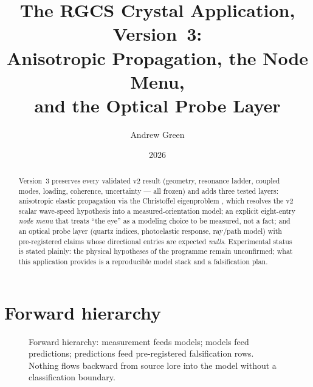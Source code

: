 \documentclass[10pt,letterpaper]{article}
\title{\vspace{-2.0em}\textbf{The RGCS Crystal Application, Version~3:\\
Anisotropic Propagation, the Node Menu,\\ and the Optical Probe Layer}}
\author{Andrew Green}
\date{2026}
\begin{document}
\maketitle

\begin{abstract}
Version~3 preserves every validated v2 result (geometry, resonance
ladder, coupled modes, loading, coherence, uncertainty --- all frozen)
and adds three tested layers: anisotropic elastic propagation via the
Christoffel eigenproblem , which resolves the v2 scalar
wave-speed hypothesis into a measured-orientation model; an explicit
eight-entry \emph{node menu} that treats ``the eye'' as a modeling choice
to be measured, not a fact; and an optical probe layer (quartz indices,
photoelastic response, ray/path model) with pre-registered claims whose
directional entries are expected \emph{nulls}. Experimental status is
stated plainly: the physical hypotheses of the programme remain
unconfirmed; what this application provides is a reproducible model stack
and a falsification plan.
\end{abstract}

\section{Forward hierarchy}
\begin{figure}[H]
\centering
{}
\caption{Forward hierarchy: measurement feeds models; models feed
predictions; predictions feed pre-registered falsification rows. Nothing
flows backward from source lore into the model without a classification
boundary.}
\label{fig:hier}
\end{figure}
\end{document}
